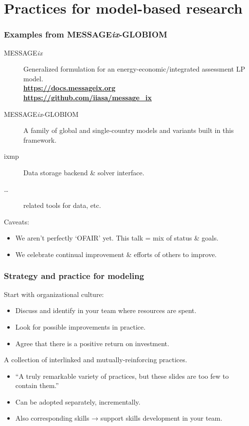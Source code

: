 \documentclass[12pt,aspectratio=169]{beamer}
\begin{document}
\section{Practices for model-based research}
\begin{frame}
\frametitle{Examples from MESSAGE\emph{ix}-GLOBIOM}

\begin{description}
  \item [MESSAGE\emph{ix}] Generalized formulation for an energy-economic/integrated assessment LP model. \\
  {\bfseries \url{https://docs.messageix.org} \\ \url{https://github.com/iiasa/message_ix}}
  \item [MESSAGE\emph{ix}-GLOBIOM] A family of global and single-country models and variants built in this framework.
  \item [\ttfamily ixmp] Data storage backend \& solver interface.
  \item […] related tools for data, etc.
\end{description}

\bigskip
Caveats:
\begin{itemize}
  \item We aren't perfectly ‘OFAIR’ yet. This talk = mix of status \& goals.
  \item We celebrate continual improvement \& efforts of others to improve.
\end{itemize}

\end{frame}

\begin{frame}
\frametitle{Strategy and practice for modeling}

Start with organizational culture:
\begin{itemize}
  \item Discuss and identify in your team where resources are spent.
  \item Look for possible improvements in practice.
  \item Agree that there is a positive return on investment.
\end{itemize}

\bigskip
A collection of interlinked and mutually-reinforcing practices.
\begin{itemize}
  \item “A truly remarkable variety of practices, but these slides are too few to contain them.”
  \item Can be adopted separately, incrementally.
  \item Also corresponding skills → support skills development in your team.
\end{itemize}

\end{frame}
\end{document}
